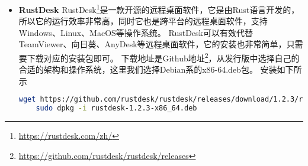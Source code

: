 \documentclass[lang=cn,a4paper,newtx]{elegantpaper}
\begin{document}
\begin{itemize}
  对于Fedora系列的操作系统，选择对应的rpm包进行安装。
  \begin{lstlisting}[language=bash]
    wget https://down.oray.com/sunlogin/linux/SunloginClient_11.0.1.44968_amd64.rpm
    sudo rpm -ivh SunloginClient_11.0.1.44968_x86_64.rpm
  \end{lstlisting}

  Linux系统可能会出现以下依赖包缺少情形，并通过对应的安装命令安装即可
  \begin{itemize}
    \item "libXss.so"依赖包缺少：
    \begin{lstlisting}[language=bash]
      sudo apt-get install libxss1 # Debian系
      sudo yum install libXScrnSaver # Fedora系
    \end{lstlisting}
    \item "webkitgtk3"依赖包缺少：
    \begin{lstlisting}[language=bash]
      sudo apt-get install libwebkitgtk-3.0-0 # Debian系
      sudo yum install libappindicator-gtk3 # Fedora系
    \end{lstlisting}
  \end{itemize}
  
  \item \textbf{RustDesk}
  RustDesk\footnote{\url{https://rustdesk.com/zh/}}是一款开源的远程桌面软件，它是由Rust语言开发的，所以它的运行效率非常高，同时它也是跨平台的远程桌面软件，支持Windows、Linux、MacOS等操作系统。
  RustDesk可以有效代替TeamViewer、向日葵、AnyDesk等远程桌面软件，它的安装也非常简单，只需要下载对应的安装包即可。
  下载地址是Github地址\footnote{\url{https://github.com/rustdesk/rustdesk/releases}}，从发行版中选择自己的合适的架构和操作系统，这里我们选择Debian系的x86-64.deb包。
  安装如下所示
  \begin{lstlisting}[language=bash]
    wget https://github.com/rustdesk/rustdesk/releases/download/1.2.3/rustdesk-1.2.3-x86_64.deb
    sudo dpkg -i rustdesk-1.2.3-x86_64.deb
  \end{lstlisting}
  

\end{itemize}
\end{document}
